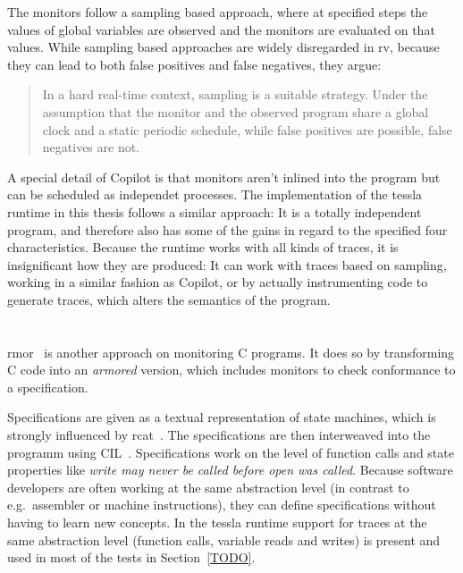 The monitors follow a sampling based approach, where at specified steps the values of global variables are observed and the monitors are evaluated
on that values.
While sampling based approaches are widely disregarded in \gls{rv}, because they can lead to both false positives and false negatives,
they argue:

\begin{quote}
  In a hard real-time context, sampling is a suitable strategy.
  Under the assumption that the monitor and the observed program share a global clock and a static periodic schedule, while false positives are possible, false negatives are not.~\cite{Pike2010}
\end{quote}

A special detail of Copilot is that monitors aren't inlined into the program but can be scheduled as independet processes.
The implementation of the \gls{tessla} runtime in this thesis follows a similar approach: It is a totally independent program,
and therefore also has some of the gains in regard to the specified four characteristics.
Because the runtime works with all kinds of traces, it is insignificant how they are produced:
It can work with traces based on sampling, working in a similar fashion as Copilot, or by actually instrumenting code to generate
traces, which alters the semantics of the program.

\section{}
\label{sec:related:rmor}

\gls{rmor}~\citep{Havelund2008} is another approach on monitoring C programs.
It does so by transforming C code into an \emph{armored} version, which includes monitors to check conformance to a specification.

Specifications are given as a textual representation of state machines, which is strongly influenced by \gls{rcat}~\citep{Smith2008}.
The specifications are then interweaved into the programm using CIL~\cite{Necula2002}.
Specifications work on the level of function calls and state properties like \emph{write may never be called before open was called}.
Because software developers are often working at the same abstraction level (in contrast to e.g.\ assembler or machine instructions), they can define specifications without having to learn new concepts.
In the \gls{tessla} runtime support for traces at the same abstraction level (function calls, variable reads and writes) is present and used in most of the tests in Section~\ref{TODO}.

